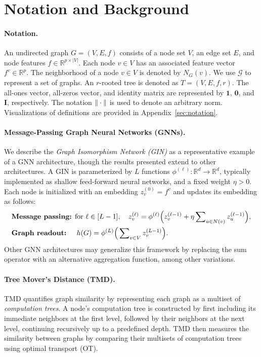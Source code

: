 \section{Notation and Background}\label{sec:prelim}

\paragraph{Notation.} An undirected graph $G = (V, E, f)$ consists of a node set $V$, an edge set $E$, and node features $f \in \mathbb{R}^{p \times |V|}$. Each node $v \in V$ has an associated feature vector $f^v \in \mathbb{R}^p$. The neighborhood of a node $v \in V$ is denoted by $N_G(v)$. We use $\mathcal{G}$ to represent a set of graphs. An $r$-rooted tree is denoted as $T = (V, E, f, r)$. The all-ones vector, all-zeros vector, and identity matrix are represented by $\bm{1}$, $\bm{0}$, and $\bm{I}$, respectively. The notation $\Vert \cdot \Vert$ is used to denote an arbitrary norm. Visualizations of definitions are provided in Appendix~\ref{sec:notation}.


\paragraph{Message-Passing Graph Neural Networks (GNNs).} We describe the \emph{Graph Isomorphism Network (GIN)} \citep{xu19gin} as a representative example of a GNN architecture, though the results presented extend to other architectures. A GIN is parameterized by $L$ functions $\phi^{(\ell)}: \mathbb{R}^d \to \mathbb{R}^d$, typically implemented as shallow feed-forward neural networks, and a fixed weight $\eta > 0$. Each node is initialized with an embedding $z_v^{(0)} = f^v$ and updates its embedding as follows:
\begin{align*}
    &\text{\textbf{Message passing:} for } \ell \in [L-1], \quad
    z_v^{(\ell)} = \phi^{(\ell)} \Big(z_v^{(\ell-1)} + \eta \sum\nolimits_{u \in N(v)} z_u^{(\ell-1)}\Big), \\
    &\text{\textbf{Graph readout:} } \quad
    h(G) = \phi^{(L)} \Big(\sum\nolimits_{v \in V} z_v^{(L-1)}\Big).
\end{align*}
Other GNN architectures may generalize this framework by replacing the sum operator with an alternative aggregation function, among other variations.

\paragraph{Tree Mover's Distance (TMD).}  
TMD \citep{Chuang22:Tree} quantifies graph similarity by representing each graph as a multiset of \emph{computation trees}. A node's computation tree is constructed by first including its immediate neighbors at the first level, followed by their neighbors at the next level, continuing recursively up to a predefined depth. TMD then measures the similarity between graphs by comparing their multisets of computation trees using optimal transport (OT).


